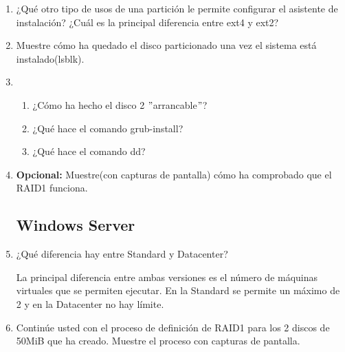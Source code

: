 \documentclass[paper=a4, fontsize=11pt]{scrartcl} %
\numberwithin{equation}{section} %
\numberwithin{figure}{section} %
\numberwithin{table}{section} %
\begin{document}
\begin{enumerate}
		\item ¿Qué otro tipo de usos de una partición le permite configurar el asistente de instalación?
		¿Cuál es la principal diferencia entre ext4 y ext2?
		
		\item Muestre cómo ha quedado el disco particionado una vez el sistema está instalado(lsblk).
		
		\item \begin{enumerate}
			\item ¿Cómo ha hecho el disco 2 $"$arrancable$"$?
			
			\item ¿Qué hace el comando grub-install?
			
			\item ¿Qué hace el comando dd?
		\end{enumerate}
		
		\item \textbf{Opcional:} Muestre(con capturas de pantalla) cómo ha comprobado que el RAID1
		funciona.
		
	\subsection{Windows Server}
		\item ¿Qué diferencia hay entre Standard y Datacenter?
		
		La principal diferencia entre ambas versiones es el número de máquinas virtuales que se
		permiten ejecutar. En la Standard se permite un máximo de 2 y en la Datacenter no hay
		límite.\cite{W12_v}
		
		\item Continúe usted con el proceso de definición de RAID1 para los 2 discos de 50MiB que
		ha creado. Muestre el proceso con capturas de pantalla.
		

\end{enumerate}
\end{document}
